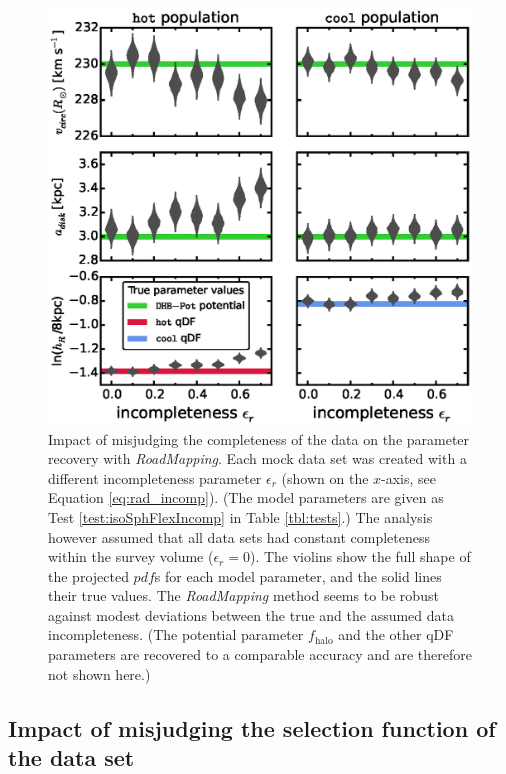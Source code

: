 \documentclass[iop,revtex4,numberedappendix,appendixfloats]{emulateapj}
\newcommand{\pdf}{\ensuremath{pdf}}
\newcommand{\RM}{{\sl RoadMapping}}
\begin{document}
\begin{figure}[!htbp]
\centering
\includegraphics[width=\columnwidth]{MWbdhIncompR_violins.eps}
\caption{Impact of misjudging the completeness of the data on the parameter recovery with \RM{}. Each mock data set was created with a different incompleteness parameter $\epsilon_r$ (shown on the $x$-axis, see Equation \eqref{eq:rad_incomp}). (The model parameters are given as Test \ref{test:isoSphFlexIncomp} in Table \ref{tbl:tests}.) The analysis however assumed that all data sets had constant completeness within the survey volume ($\epsilon_r = 0$). The violins show the full shape of the projected \pdf{}s for each model parameter, and the solid lines their true values. The \RM{} method seems to be robust against modest deviations between the true and the assumed data incompleteness. (The potential parameter $f_\text{halo}$ and the other qDF parameters are recovered to a comparable accuracy and are therefore not shown here.)} 
\label{fig:MWdhbIncompR_violins}
\end{figure}

\subsection{Impact of misjudging the selection function of the data set} \label{sec:results_incompR}
\end{document}
